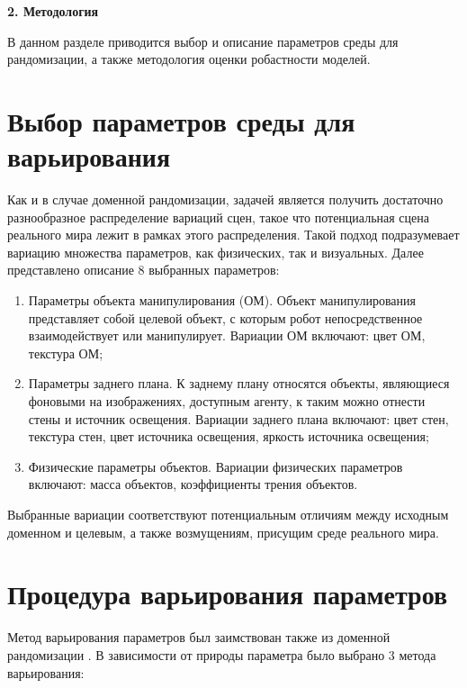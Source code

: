 \newpage
\begin{center}
  \textbf{\large 2. Методология}
\end{center}
\label{method}
В данном разделе приводится выбор и описание параметров среды для рандомизации, а также методология оценки робастности моделей.

\section{Выбор параметров среды для варьирования}

    Как и в случае доменной рандомизации, задачей является получить достаточно разнообразное распределение вариаций сцен, такое что потенциальная сцена реального мира лежит в рамках этого распределения. Такой подход подразумевает вариацию множества параметров, как физических, так и визуальных. Далее представлено описание 8 выбранных параметров:

    \begin{enumerate}
        \item Параметры объекта манипулирования (ОМ). Объект манипулирования представляет собой целевой объект, с которым робот непосредственное взаимодействует или манипулирует. Вариации ОМ включают: цвет ОМ, текстура ОМ;

        \item Параметры заднего плана. К заднему плану относятся объекты, являющиеся фоновыми на изображениях, доступным агенту, к таким можно отнести стены и источник освещения. Вариации заднего плана включают: цвет стен, текстура стен, цвет источника освещения, яркость источника освещения;

        \item Физические параметры объектов. Вариации физических параметров включают: масса объектов, коэффициенты трения объектов.
    \end{enumerate}

    Выбранные вариации соответствуют потенциальным отличиям между исходным доменном и целевым, а также возмущениям, присущим среде реального мира. 

\section{Процедура варьирования параметров}
        \label{method_randomization}
    Метод варьирования параметров был заимствован также из доменной рандомизации \cite{Peng_2018}. В зависимости от природы параметра было выбрано 3 метода варьирования:

